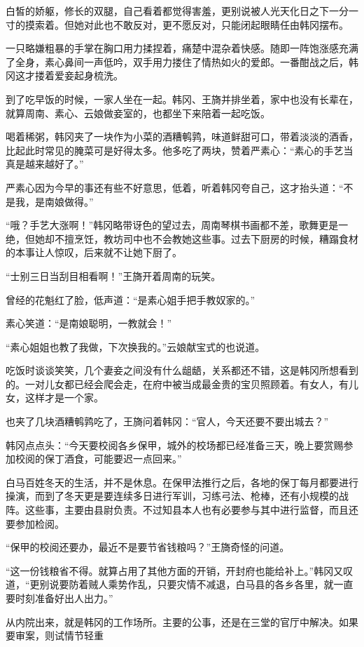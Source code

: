 白皙的娇躯，修长的双腿，自己看着都觉得害羞，更别说被人光天化日之下一分一寸的摸索着。但她对此也不敢反对，更不愿反对，只能闭起眼睛任由韩冈摆布。

一只略嫌粗暴的手掌在胸口用力揉捏着，痛楚中混杂着快感。随即一阵饱涨感充满了全身，素心鼻间一声低吟，双手用力搂住了情热如火的爱郎。一番酣战之后，韩冈这才搂着爱妾起身梳洗。

到了吃早饭的时候，一家人坐在一起。韩冈、王旖并排坐着，家中也没有长辈在，就算周南、素心、云娘做妾室的，也都坐下来陪着一起吃饭。

喝着稀粥，韩冈夹了一块作为小菜的酒糟鹌鹑，味道鲜甜可口，带着淡淡的酒香，比起此时常见的腌菜可是好得太多。他多吃了两块，赞着严素心：“素心的手艺当真是越来越好了。”

严素心因为今早的事还有些不好意思，低着，听着韩冈夸自己，这才抬头道：“不是我，是南娘做得。”

“哦？手艺大涨啊！”韩冈略带讶色的望过去，周南琴棋书画都不差，歌舞更是一绝，但她却不擅烹饪，教坊司中也不会教她这些事。过去下厨房的时候，糟蹋食材的本事让人惊叹，后来就不让她下厨了。

“士别三日当刮目相看啊！”王旖开着周南的玩笑。

曾经的花魁红了脸，低声道：“是素心姐手把手教奴家的。”

素心笑道：“是南娘聪明，一教就会！”

“素心姐姐也教了我做，下次换我的。”云娘献宝式的也说道。

吃饭时谈谈笑笑，几个妻妾之间没有什么龃龉，关系都还不错，这是韩冈所想看到的。一对儿女都已经会爬会走，在府中被当成最金贵的宝贝照顾着。有女人，有儿女，这样才是一个家。

也夹了几块酒糟鹌鹑吃了，王旖问着韩冈：“官人，今天还要不要出城去？”

韩冈点点头：“今天要校阅各乡保甲，城外的校场都已经准备三天，晚上要赏赐参加校阅的保丁酒食，可能要迟一点回来。”

白马百姓冬天的生活，并不是休息。在保甲法推行之后，各地的保丁每月都要进行操演，而到了冬天更是要连续多日进行军训，习练弓法、枪棒，还有小规模的战阵。这些事，主要由县尉负责。不过知县本人也有必要参与其中进行监督，而且还要参加检阅。

“保甲的校阅还要办，最近不是要节省钱粮吗？”王旖奇怪的问道。

“这一份钱粮省不得。就算占用了其他方面的开销，开封府也能给补上。”韩冈又叹道，“更别说要防着贼人乘势作乱，只要灾情不减退，白马县的各乡各里，就一直要时刻准备好出人出力。”

从内院出来，就是韩冈的工作场所。主要的公事，还是在三堂的官厅中解决。如果要审案，则试情节轻重

